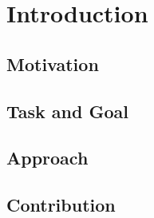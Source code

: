 
\section{Introduction}
\subsection{Motivation}
\subsection{Task and Goal}
\subsection{Approach}
\subsection{Contribution}